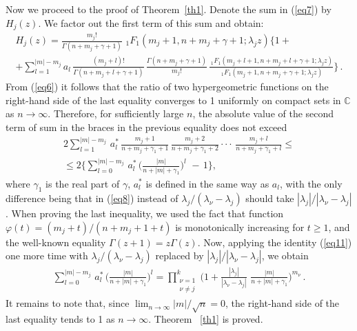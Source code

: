\documentclass[
11pt,%
tightenlines,%
twoside,%
onecolumn,%
nofloats,%
nobibnotes,%
nofootinbib,%
superscriptaddress,%
noshowpacs,%
centertags]%
{revtex4}
\begin{document}
\vspace{0.2 cm} Now we proceed to the proof of Theorem~\ref{th1}.
Denote the sum in (\ref{eq7}) by  $H_j(z)$. We factor out the first term of this sum and obtain:
\begin{gather*}
H_j(z)=\frac{m_j!}{\Gamma(n+m_j+\gamma+1)}\,\,_1F_1(m_j+1,n+m_j+\gamma+1;\lambda_jz)\biggl\{1+\\
+\sum_{l=1}^{|m|-m_j}a_l\,\frac{(m_j+l)!}{\Gamma(n+m_j+l+\gamma+1)}\,
\frac{\Gamma(n+m_j+\gamma+1)}{m_j!}
\,\frac{\,_1F_1(m_j+l+1,n+m_j+l+\gamma+1;\lambda_jz)}
{\,_1F_1(m_j+1,n+m_j+\gamma+1;\lambda_jz)}\biggl\}\,.
\end{gather*}
From (\ref{eq6}) it follows that the ratio of two hypergeometric functions
on the right-hand side of the last equality converges to 1 uniformly on
compact sets in $\mathbb{C}$ as $n\rightarrow\infty$.
Therefore, for sufficiently large $n$, the absolute value of the second term of sum in the
braces in the previous equality does not exceed
\begin{gather*}
2\sum_{l=1}^{|m|-m_j}\,a_l^*\,\frac{m_j+1}{n+m_j+\gamma_1+1}\,\frac{m_j+2}{n+m_j+\gamma_1+2}
\cdot\cdot\cdot\,\frac{m_j+l}{n+m_j+\gamma_1+l}\leqslant\\
\leqslant
2\biggl\{\sum_{l=0}^{|m|-m_j}\,a_l^*\,\biggl(\frac{|m|}{n+|m|+\gamma_1}\biggl)^l\,
\,-\,1\biggl\},
\end{gather*}
where $\gamma_1$ is the real part of $\gamma$,
 $a_l^*$ is defined in the same way as $a_l$, with the only difference
 being that in (\ref{eq8}) instead of
 $\lambda_j/(\lambda_{\nu}-\lambda_j)$ should take
 $|\lambda_j|/|\lambda_{\nu}-\lambda_j|$.
When proving the last inequality, we used the fact that function
$\varphi(t)=(m_j+t)/(n+m_j+1+t)$ is monotonically increasing
for $t\geqslant 1$, and the well-known equality
$\Gamma(z+1)=z\Gamma(z)$. Now, applying the identity
(\ref{eq11}) one more time with $\lambda_j/(\lambda_{\nu}-\lambda_j)$
replaced by $|\lambda_j|/|\lambda_{\nu}-\lambda_j|$, we obtain
\begin{eqnarray*}
\sum_{l=0}^{|m|-m_j}\,a_l^*\,\biggl(\frac{|m|}{n+|m|+\gamma_1}\biggl)^l=
\prod^{k}_{\substack{
  \nu=1 \\
  \nu\neq j
 }}\biggl(1+\frac{|\lambda_j|}{|\lambda_{\nu}-\lambda_j|}\,\,
 \frac{|m|}{n+|m|+\gamma_1}\biggl)^{m_{\nu}}\,.
\end{eqnarray*}
It remains to note that, since $\lim_{n\rightarrow\infty}|m|/\sqrt{n}=0$,
the right-hand side of the last equality tends to 1 as
$n\rightarrow\infty$. Theorem ~\ref{th1} is proved.
\end{document}
